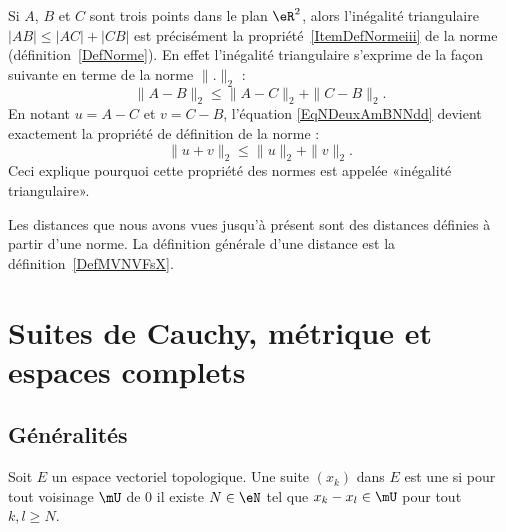 \begin{remark}
	Si $A$, $B$ et $C$ sont trois points dans le plan $\eR^2$, alors l'inégalité triangulaire $| AB |\leq| AC |+| CB |$ est précisément la propriété~\ref{ItemDefNormeiii} de la norme (définition~\ref{DefNorme}). En effet l'inégalité triangulaire s'exprime de la façon suivante en terme de la norme $\| . \|_2$ :
	\begin{equation}	\label{EqNDeuxAmBNNdd}
		\| A-B \|_2\leq \| A-C \|_2+\| C-B \|_2.
	\end{equation}
	En notant $u=A-C$ et $v=C-B$, l'équation \eqref{EqNDeuxAmBNNdd} devient exactement la propriété de définition de la norme :
	\begin{equation}
		\| u+v \|_2\leq \| u \|_2+\| v \|_2.
	\end{equation}
	Ceci explique pourquoi cette propriété des normes est appelée «inégalité triangulaire».
\end{remark}

Les distances que nous avons vues jusqu'à présent sont des distances définies à partir d'une norme. La définition générale d'une distance est la définition~\ref{DefMVNVFsX}.

\section{Suites de Cauchy, métrique et espaces complets}

\subsection{Généralités}

\begin{definition}   \label{DefZSnlbPc}
    Soit \( E\) un espace vectoriel topologique. Une suite \( (x_k)\) dans \( E\) est une  si pour tout voisinage \( \mU\) de \( 0\) il existe \( N\in \eN\) tel que \( x_k-x_l\in\mU\) pour tout \( k,l\geq N\).
\end{definition}

